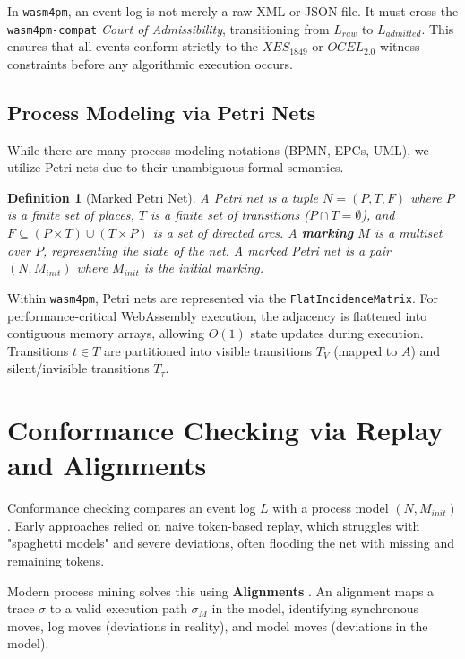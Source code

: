 \documentclass[11pt,a4paper]{article}
\newtheorem{definition}{Definition}
\begin{document}
In \texttt{wasm4pm}, an event log is not merely a raw XML or JSON file. It must cross the \texttt{wasm4pm-compat} \textit{Court of Admissibility}, transitioning from $L_{raw}$ to $L_{admitted}$. This ensures that all events conform strictly to the $XES_{1849}$ or $OCEL_{2.0}$ witness constraints before any algorithmic execution occurs.

\subsection{Process Modeling via Petri Nets}
While there are many process modeling notations (BPMN, EPCs, UML), we utilize Petri nets due to their unambiguous formal semantics.

\begin{definition}[Marked Petri Net]
A Petri net is a tuple $N = (P, T, F)$ where $P$ is a finite set of places, $T$ is a finite set of transitions ($P \cap T = \emptyset$), and $F \subseteq (P \times T) \cup (T \times P)$ is a set of directed arcs. 
A \textbf{marking} $M$ is a multiset over $P$, representing the state of the net. A marked Petri net is a pair $(N, M_{init})$ where $M_{init}$ is the initial marking.
\end{definition}

Within \texttt{wasm4pm}, Petri nets are represented via the \texttt{FlatIncidenceMatrix}. For performance-critical WebAssembly execution, the adjacency is flattened into contiguous memory arrays, allowing $O(1)$ state updates during execution. Transitions $t \in T$ are partitioned into visible transitions $T_V$ (mapped to $A$) and silent/invisible transitions $T_\tau$.

\section{Conformance Checking via Replay and Alignments}

Conformance checking compares an event log $L$ with a process model $(N, M_{init})$. Early approaches relied on naive token-based replay, which struggles with "spaghetti models" and severe deviations, often flooding the net with missing and remaining tokens.

Modern process mining solves this using \textbf{Alignments} \cite{Adriansyah2011}. An alignment maps a trace $\sigma$ to a valid execution path $\sigma_M$ in the model, identifying synchronous moves, log moves (deviations in reality), and model moves (deviations in the model).
\end{document}
